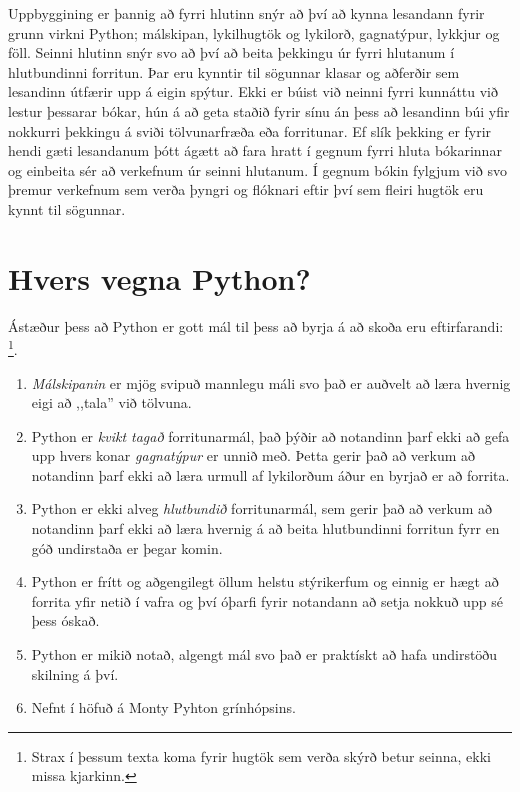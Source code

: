 \documentclass[11pt,fleqn]{book} %
\begin{document}
Uppbyggining er þannig að fyrri hlutinn snýr að því að kynna lesandann fyrir grunn virkni Python; málskipan, lykilhugtök og lykilorð, gagnatýpur, lykkjur og föll. 
Seinni hlutinn snýr svo að því að beita þekkingu úr fyrri hlutanum í hlutbundinni forritun. 
Þar eru kynntir til sögunnar klasar og aðferðir sem lesandinn útfærir upp á eigin spýtur. 
Ekki er búist við neinni fyrri kunnáttu við lestur þessarar bókar, hún á að geta staðið fyrir sínu án þess að lesandinn búi yfir nokkurri þekkingu á sviði tölvunarfræða eða forritunar. 
Ef slík þekking er fyrir hendi gæti lesandanum þótt ágætt að fara hratt í gegnum fyrri hluta bókarinnar og einbeita sér að verkefnum úr seinni hlutanum. 
Í gegnum bókin fylgjum við svo þremur verkefnum sem verða þyngri og flóknari eftir því sem fleiri hugtök eru kynnt til sögunnar. 

\section{Hvers vegna Python?}

Ástæður þess að Python er gott mál til þess að byrja á að skoða eru eftirfarandi: \footnote{Strax í þessum texta koma fyrir hugtök sem verða skýrð betur seinna, ekki missa kjarkinn.}.

\begin{enumerate}
	\item \textit{Málskipanin} er mjög svipuð mannlegu máli svo það er auðvelt að læra hvernig eigi að ,,tala'' við tölvuna.
	\item  Python er \textit{kvikt tagað} forritunarmál, það þýðir að notandinn þarf ekki að gefa upp hvers konar \textit{gagnatýpur} er unnið með. 
	Þetta gerir það að verkum að notandinn þarf ekki að læra urmull af lykilorðum áður en byrjað er að forrita.
	\item  Python er ekki alveg \textit{hlutbundið} forritunarmál, sem gerir það að verkum að notandinn þarf ekki að læra hvernig á að beita hlutbundinni forritun fyrr en góð undirstaða er þegar komin.
	\item Python er frítt og aðgengilegt öllum helstu stýrikerfum og einnig er hægt að forrita yfir netið í vafra og því óþarfi fyrir notandann að setja nokkuð upp sé þess óskað.
	\item Python er mikið notað, algengt mál svo það er praktískt að hafa undirstöðu skilning á því.
	\item Nefnt í höfuð á Monty Pyhton grínhópsins.
\end{enumerate}
\end{document}
